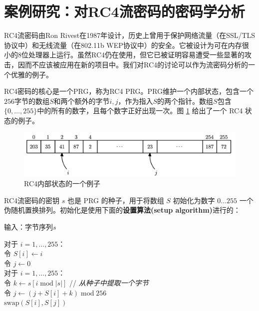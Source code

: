 \section{案例研究：对RC4流密码的密码学分析}

RC4流密码由Ron Rivest在1987年设计，历史上曾用于保护网络流量（在SSL/TLS协议中）和无线流量（在802.11b WEP协议中）的安全。它被设计为可在内存很小的$8$位处理器上运行。虽然RC4仍在使用，但它已被证明容易遭受一些显著的攻击，因而不应该被应用在新的项目中。我们对RC4的讨论可以作为流密码分析的一个优雅的例子。

RC4密码的核心是一个PRG，称为RC4 PRG。PRG维护一个内部状态，包含一个$256$字节的数组$S$和两个额外的字节$i,j$，作为指入$S$的两个指针。数组$S$包含$\{0,\dots,255\}$中的所有的数字，且每个数字正好出现一次。图 \ref{fig:3-12} 给出了一个 RC4 状态的例子。

\begin{figure}
  \centering
  \includegraphics[width=0.75\linewidth]{figures/chapter3/fig12.png}
  \caption{RC4内部状态的一个例子}
  \label{fig:3-12}
\end{figure}

RC4流密码的密钥 $s$ 也是 PRG 的种子，用于将数组 $S$ 初始化为数字 $0 \dots 255$ 一个伪随机置换排列。初始化是使用下面的\textbf{设置算法(setup algorithm)}进行的：

\vspace*{5pt}

\hspace*{5pt} 输入：字节序列$s$

\vspace{3pt}

\hspace*{5pt} 对于 $i=1,\dots,255$：\\
\hspace*{50pt} 令 $S[i]\leftarrow i$ \\
\hspace*{26pt} 令 $j\leftarrow0$\\
\hspace*{26pt} 对于 $i=1,\dots,255$：\\
\hspace*{50pt} 令 $k\leftarrow s[i\;\mathrm{mod}\;|s|]$ \quad\quad // \emph{从种子中提取一个字节}\\
\hspace*{50pt} 令 $j\leftarrow(j+S[i]+k)\;\mathrm{mod}\;256$\\
\hspace*{50pt} $\mathrm{swap}(S[i],S[j])$

